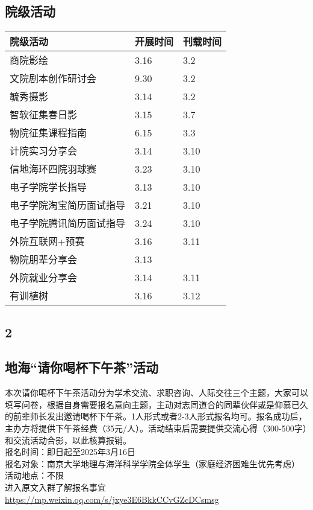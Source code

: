 \documentclass[letterpaper, 12pt]{article}
\begin{document}
\begin{multicols}{2}
\section{院级活动}
\begin{tabular}{|>{\centering\arraybackslash}m{}|m{}|m{}|}
    \hline
    院级活动 & 开展时间 & 刊载时间\\
    \hline\hline
    商院影绘 & 3.16 & 3.2\\
    文院剧本创作研讨会 & 9.30 & 3.2\\
    毓秀摄影 & 3.14 & 3.2\\
    智软征集春日影 & 3.15 & 3.7\\
    物院征集课程指南 & 6.15 & 3.3\\
    计院实习分享会 & 3.14 & 3.10\\
    信地海环四院羽球赛 & 3.23 & 3.10\\
    电子学院学长指导 & 3.13 & 3.10\\
    电子学院淘宝简历面试指导 & 3.21 & 3.10\\
    电子学院腾讯简历面试指导 & 3.24 & 3.10\\
    外院互联网+预赛 & 3.16 & 3.11\\
    物院朋辈分享会 & 3.13 &  \\
    外院就业分享会 & 3.14 & 3.11\\
    有训植树 & 3.16 & 3.12\\
    \hline
\end{tabular}
\subsection{2}

\subsection{地海“请你喝杯下午茶”活动}
本次请你喝杯下午茶活动分为学术交流、求职咨询、人际交往三个主题，大家可以填写问卷，根据自身需要报名意向主题，主动对志同道合的同辈伙伴或是仰慕已久的前辈师长发出邀请喝杯下午茶。1人形式或者2-3人形式报名均可。报名成功后，主办方将提供下午茶经费（35元/人）。活动结束后需要提供交流心得（300-500字）和交流活动合影，以此核算报销。\\
报名时间：即日起至2025年3月16日\\
报名对象：南京大学地理与海洋科学学院全体学生（家庭经济困难生优先考虑）\\
活动地点：不限\\
进入原文入群了解报名事宜\url{https://mp.weixin.qq.com/s/jxye3E6BkkCCvGZcDCsmsg}


\end{multicols}
\end{document}
